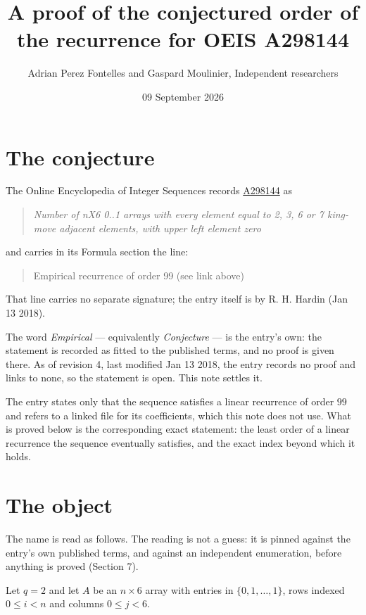 \documentclass[11pt]{article}
\title{A proof of the conjectured order of the recurrence for OEIS A298144}
\author{Adrian Perez Fontelles and Gaspard Moulinier, Independent researchers}
\date{09 September 2026}
\theoremstyle{definition}
\begin{document}
\maketitle
\section{The conjecture}

The Online Encyclopedia of Integer Sequences records \href{https://oeis.org/A298144}{A298144} as

\begin{quote}\itshape Number of nX6 0..1 arrays with every element equal to 2, 3, 6 or 7 king-move adjacent elements, with upper left element zero\end{quote}

and carries in its Formula section the line:

\begin{quote}\ttfamily Empirical recurrence of order 99 (see link above)\end{quote}

That line carries no separate signature; the entry itself is by R. H. Hardin (Jan 13 2018).

The word {\itshape Empirical} --- equivalently {\itshape Conjecture} --- is the entry's own: the statement is recorded as fitted to the published terms, and no proof is given there. As of revision 4, last modified Jan 13 2018, the entry records no proof and links to none, so the statement is open. This note settles it.

The entry states only that the sequence satisfies a linear recurrence of order $99$ and refers to a linked file for its coefficients, which this note does not use. What is proved below is the corresponding exact statement: the least order of a linear recurrence the sequence eventually satisfies, and the exact index beyond which it holds.

\section{The object}

The name is read as follows. The reading is not a guess: it is pinned against the entry's own published terms, and against an independent enumeration, before anything is proved (Section 7).

Let $q = 2$ and let $A$ be an $n \times 6$ array with entries in $\{0,1,\dots,1\}$, rows indexed $0 \le i < n$ and columns $0 \le j < 6$.
\end{document}

